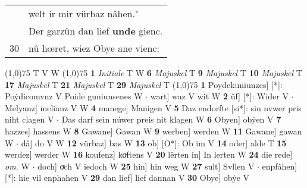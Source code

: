 \documentclass[8pt,a4paper,notitlepage]{article}
\begin{document}
\begin{table}[ht]
\begin{minipage}[t]{0.5\linewidth}
\begin{tabular}{rl}
 & welt ir mir vürbaz nâhen."\\ 
 & Der garzûn dan lief \textbf{unde} gienc.\\ 
30 & nû hœret, wiez Obye ane vienc:\\ 
\end{tabular}
\scriptsize
\line(1,0){75} \newline
T V W \newline
\line(1,0){75} \newline
\textbf{1} \textit{Initiale} T W  \textbf{6} \textit{Majuskel} T  \textbf{9} \textit{Majuskel} T  \textbf{10} \textit{Majuskel} T  \textbf{17} \textit{Majuskel} T  \textbf{21} \textit{Majuskel} T  \textbf{29} \textit{Majuskel} T  \newline
\line(1,0){75} \newline
\textbf{1} Poydekuniunzes] [*]: Poẏdicomvnz V Poide guniunsenes W  $\cdot$ wart] waz V wit W \textbf{2} ûf] [*]: Wider V  $\cdot$ Melyanz] melianz V W \textbf{4} manege] Manigen V \textbf{5} Daz endorfte [si*]: sin nvwer pris niht clagen V  $\cdot$ Das darf sein núwer preis nit klagen W \textbf{6} Obyen] obẏen V \textbf{7} hazzes] hassens W \textbf{8} Gawane] Gawan W \textbf{9} werben] werden W \textbf{11} Gawane] gawan W  $\cdot$ dâ] do V W \textbf{12} vürbaz] bas W \textbf{13} ob] [O*]: Ob im V \textbf{14} oder] alde T \textbf{15} werdez] werder W \textbf{16} koufenz] koͮftens V \textbf{20} lêrten in] In lerten W \textbf{24} die rede] \textit{om.} W  $\cdot$ doch] oͮch V iedoch W \textbf{25} hin] hin weg W \textbf{27} sult] Svllen V  $\cdot$ enpfâhen] [*]: hie vil enphahen V \textbf{29} dan lief] lief dannan V \textbf{30} Obye] obẏe V \newline
\end{minipage}
\end{table}
\end{document}
